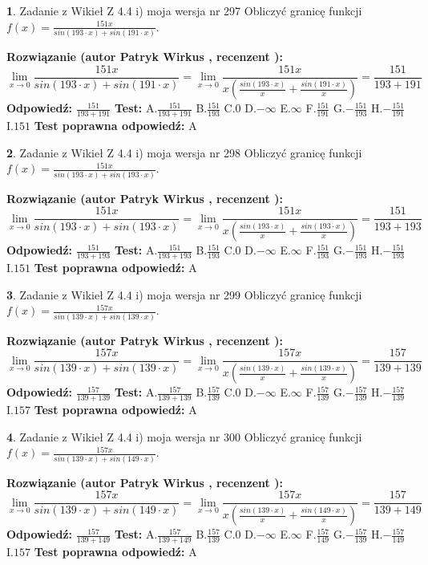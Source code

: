 \documentclass[12pt, a4paper]{article}
\theoremstyle{definition} %
\newtheorem{zad}{}
\newcommand{\zadStart}[1]{\begin{zad}#1\newline}
\newcommand{\zadStop}{\end{zad}}
\newcommand{\rozwStart}[2]{\noindent \textbf{Rozwiązanie (autor #1 , recenzent #2): }\newline}
\newcommand{\rozwStop}{\newline}
\newcommand{\odpStart}{\noindent \textbf{Odpowiedź:}\newline}
\newcommand{\odpStop}{\newline}
\newcommand{\testStart}{\noindent \textbf{Test:}\newline}
\newcommand{\testStop}{\newline}
\newcommand{\kluczStart}{\noindent \textbf{Test poprawna odpowiedź:}\newline}
\newcommand{\kluczStop}{\newline}
\begin{document}
\zadStart{Zadanie z Wikieł Z 4.4 i) moja wersja nr 297}
Obliczyć granicę funkcji $f(x)=\frac{151x}{sin(193\cdot x) +sin(191\cdot x)}$.
\zadStop
\rozwStart{Patryk Wirkus}{}
$$\lim\limits_{x\to 0}\frac{151x}{sin(193\cdot x) +sin(191\cdot x)}=\lim\limits_{x\to 0}\frac{151x}{x(\frac{sin(193\cdot x)}{x}+\frac{sin(191\cdot x)}{x})}=\frac{151}{193+191}$$
\rozwStop
\odpStart
$\frac{151}{193+191}$
\odpStop
\testStart
A.$\frac{151}{193+191}$
B.$\frac{151}{193}$
C.$0$
D.$-\infty$
E.$\infty$
F.$\frac{151}{191}$
G.$-\frac{151}{193}$
H.$-\frac{151}{191}$
I.$151$
\testStop
\kluczStart
A
\kluczStop



\zadStart{Zadanie z Wikieł Z 4.4 i) moja wersja nr 298}
Obliczyć granicę funkcji $f(x)=\frac{151x}{sin(193\cdot x) +sin(193\cdot x)}$.
\zadStop
\rozwStart{Patryk Wirkus}{}
$$\lim\limits_{x\to 0}\frac{151x}{sin(193\cdot x) +sin(193\cdot x)}=\lim\limits_{x\to 0}\frac{151x}{x(\frac{sin(193\cdot x)}{x}+\frac{sin(193\cdot x)}{x})}=\frac{151}{193+193}$$
\rozwStop
\odpStart
$\frac{151}{193+193}$
\odpStop
\testStart
A.$\frac{151}{193+193}$
B.$\frac{151}{193}$
C.$0$
D.$-\infty$
E.$\infty$
F.$\frac{151}{193}$
G.$-\frac{151}{193}$
H.$-\frac{151}{193}$
I.$151$
\testStop
\kluczStart
A
\kluczStop



\zadStart{Zadanie z Wikieł Z 4.4 i) moja wersja nr 299}
Obliczyć granicę funkcji $f(x)=\frac{157x}{sin(139\cdot x) +sin(139\cdot x)}$.
\zadStop
\rozwStart{Patryk Wirkus}{}
$$\lim\limits_{x\to 0}\frac{157x}{sin(139\cdot x) +sin(139\cdot x)}=\lim\limits_{x\to 0}\frac{157x}{x(\frac{sin(139\cdot x)}{x}+\frac{sin(139\cdot x)}{x})}=\frac{157}{139+139}$$
\rozwStop
\odpStart
$\frac{157}{139+139}$
\odpStop
\testStart
A.$\frac{157}{139+139}$
B.$\frac{157}{139}$
C.$0$
D.$-\infty$
E.$\infty$
F.$\frac{157}{139}$
G.$-\frac{157}{139}$
H.$-\frac{157}{139}$
I.$157$
\testStop
\kluczStart
A
\kluczStop



\zadStart{Zadanie z Wikieł Z 4.4 i) moja wersja nr 300}
Obliczyć granicę funkcji $f(x)=\frac{157x}{sin(139\cdot x) +sin(149\cdot x)}$.
\zadStop
\rozwStart{Patryk Wirkus}{}
$$\lim\limits_{x\to 0}\frac{157x}{sin(139\cdot x) +sin(149\cdot x)}=\lim\limits_{x\to 0}\frac{157x}{x(\frac{sin(139\cdot x)}{x}+\frac{sin(149\cdot x)}{x})}=\frac{157}{139+149}$$
\rozwStop
\odpStart
$\frac{157}{139+149}$
\odpStop
\testStart
A.$\frac{157}{139+149}$
B.$\frac{157}{139}$
C.$0$
D.$-\infty$
E.$\infty$
F.$\frac{157}{149}$
G.$-\frac{157}{139}$
H.$-\frac{157}{149}$
I.$157$
\testStop
\kluczStart
A
\kluczStop
\end{document}
